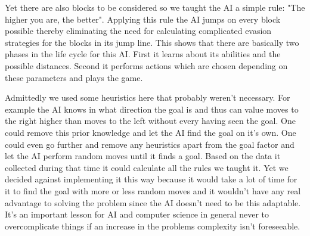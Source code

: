 Yet there are also blocks to be considered so we taught the AI a simple rule: "The higher you are, the better". Applying this rule the AI jumps on every block possible thereby eliminating the need for calculating complicated evasion strategies for the blocks in its jump line.
This shows that there are basically two phases in the life cycle for this AI. First it learns about its abilities and the possible distances. Second it performs actions which are chosen depending on these parameters and plays the game.

Admittedly we used some heuristics here that probably weren't necessary. For example the AI knows in what direction the goal is and thus can value moves to the right higher than moves to the left without every having seen the goal. One could remove this prior knowledge and let the AI find the goal on it's own. One could even go further and remove any heuristics apart from the goal factor and let the AI perform random moves until it finds a goal. Based on the data it collected during that time it could calculate all the rules we taught it. Yet we decided against implementing it this way because it would take a lot of time for it to find the goal with more or less random moves and it wouldn't have any real advantage to solving the problem since the AI doesn't need to be this adaptable. It's an important lesson for AI and computer science in general never to overcomplicate things if an increase in the problems complexity isn't foreseeable.
